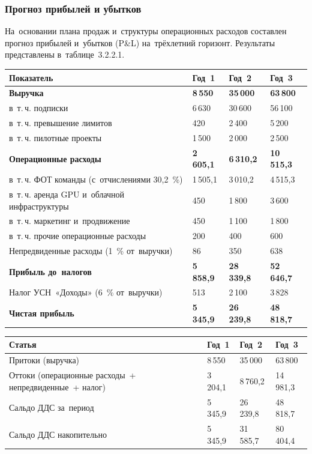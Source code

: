 \subsubsection{Прогноз прибылей и убытков}

На~основании плана продаж и~структуры операционных расходов составлен прогноз
прибылей и~убытков (P\&L) на~трёхлетний горизонт. Результаты представлены
в~таблице~3.2.2.1.

{\small
\begin{longtable}{L{9.0cm} C{1.8cm} C{1.8cm} C{1.8cm}}
\toprule
Показатель & Год~1 & Год~2 & Год~3 \\
\midrule
\endhead
\textbf{Выручка} & \textbf{8\,550} & \textbf{35\,000} & \textbf{63\,800} \\
\quad в~т.\,ч. подписки & 6\,630 & 30\,600 & 56\,100 \\
\quad в~т.\,ч. превышение лимитов & 420 & 2\,400 & 5\,200 \\
\quad в~т.\,ч. пилотные проекты & 1\,500 & 2\,000 & 2\,500 \\
\textbf{Операционные расходы} & \textbf{2\,605,1} & \textbf{6\,310,2} & \textbf{10\,515,3} \\
\quad в~т.\,ч. ФОТ команды (с~отчислениями 30,2~\%) & 1\,505,1 & 3\,010,2 & 4\,515,3 \\
\quad в~т.\,ч. аренда GPU и~облачной инфраструктуры & 450 & 1\,800 & 3\,600 \\
\quad в~т.\,ч. маркетинг и~продвижение & 450 & 1\,100 & 1\,800 \\
\quad в~т.\,ч. прочие операционные расходы & 200 & 400 & 600 \\
Непредвиденные расходы (1~\% от~выручки) & 86 & 350 & 638 \\
\textbf{Прибыль до~налогов} & \textbf{5\,858,9} & \textbf{28\,339,8} & \textbf{52\,646,7} \\
Налог УСН~«Доходы» (6~\% от~выручки) & 513 & 2\,100 & 3\,828 \\
\textbf{Чистая прибыль} & \textbf{5\,345,9} & \textbf{26\,239,8} & \textbf{48\,818,7} \\
\bottomrule
\end{longtable}
}

{\small
\begin{longtable}{L{9.0cm} C{1.8cm} C{1.8cm} C{1.8cm}}
\toprule
Статья & Год~1 & Год~2 & Год~3 \\
\midrule
\endhead
Притоки (выручка) & 8\,550 & 35\,000 & 63\,800 \\
Оттоки (операционные расходы~+ непредвиденные~+ налог) & 3\,204,1 & 8\,760,2 & 14\,981,3 \\
Сальдо ДДС за~период & 5\,345,9 & 26\,239,8 & 48\,818,7 \\
Сальдо ДДС накопительно & 5\,345,9 & 31\,585,7 & 80\,404,4 \\
\bottomrule
\end{longtable}
}

